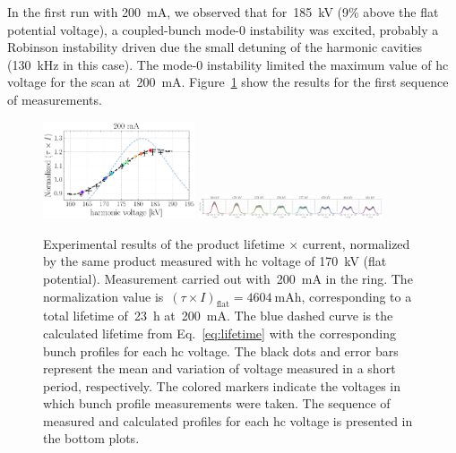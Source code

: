\documentclass[a4paper,
               ]{jacow}
\begin{document}
In the first run with \SI{200}{\milli\ampere}, we observed that for~\SI{185}{\kilo\volt} (9\% above the flat potential voltage), a coupled-bunch mode-0 instability was excited, probably a Robinson instability driven due the small detuning of the harmonic cavities (\SI{130}{\kilo\hertz} in this case). The mode-0 instability limited the maximum value of \gls{hc} voltage for the scan at~\SI{200}{\milli\ampere}. Figure~\ref{fig:200mA_profiles} show the results for the first sequence of measurements.\begin{figure}
    \centering
    \includegraphics[width=0.4\textwidth]{WEPR42_f4a.pdf}
    \includegraphics[width=0.48\textwidth]{WEPR42_f4b.pdf}
    \caption{Experimental results of the product lifetime $\times$ current, normalized by the same product measured with \gls{hc} voltage of \SI{170}{\kilo\volt} (flat potential). Measurement carried out with~\SI{200}{\milli\ampere} in the ring. The normalization value is~$(\tau \times I)_\text{flat} = \SI{4604}{\milli\ampere\hour}$, corresponding to a total lifetime of~\SI{23}{\hour} at~\SI{200}{\milli\ampere}. The blue dashed curve is the calculated lifetime from Eq.~\eqref{eq:lifetime} with the corresponding bunch profiles for each \gls{hc} voltage. The black dots and error bars represent the mean and variation of voltage measured in a short period, respectively. The colored markers indicate the voltages in which bunch profile measurements were taken. The sequence of measured and calculated profiles for each \gls{hc} voltage is presented in the bottom plots.}
    \label{fig:200mA_profiles}
\end{figure}
\end{document}
